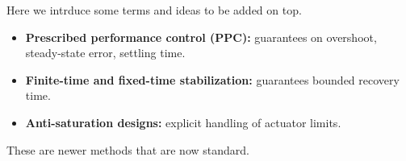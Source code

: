 Here we intrduce some terms and ideas to be added on top. 
\begin{itemize}
    \item \textbf{Prescribed performance control (PPC):} guarantees on overshoot, steady-state error, settling time.

    \item \textbf{Finite-time and fixed-time stabilization:} guarantees bounded recovery time. 

    \item \textbf{Anti-saturation designs:} explicit handling of actuator limits.
\end{itemize}


These are newer methods that are now standard. 